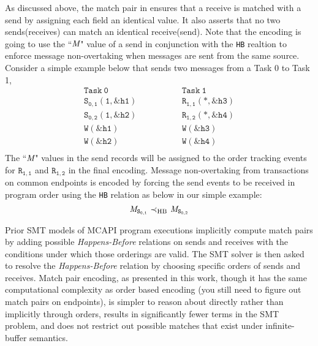 As discussed above, the match pair in  ensures that a receive is matched with a send by assigning each field an identical value. It also asserts that no two sends(receives) can match an identical receive(send). Note that the encoding is going to use the ``$\emph{M}$"  value of a send in conjunction with the \texttt{HB} realtion to enforce message non-overtaking when messages are sent from the same source. Consider a simple example below that sends two messages from a Task 0 to Task 1,
\[
\begin{array}{l|l}
\;\;\;\;\;\;\;\;\mathtt{Task\ 0}\;\;\;\;\;\;\;\; & \;\;\;\;\;\;\;\; \mathtt{Task\ 1}\;\;\;\;\;\;\;\; \\
\hline
\;\;\;\;\;\;\;\;\mathtt{S_{0,1}(1,\&h1)}\;\;\;\;\;\;\;\; & \;\;\;\;\;\;\;\; \mathtt{R_{1,1}(*,\&h3)}\;\;\;\;\;\;\;\; \\
\;\;\;\;\;\;\;\;\mathtt{S_{0,2}(1,\&h2)}\;\;\;\;\;\;\;\; & \;\;\;\;\;\;\;\; \mathtt{R_{1,2}(*,\&h4)}\;\;\;\;\;\;\;\; \\
\;\;\;\;\;\;\;\;\mathtt{W(\&h1)}\;\;\;\;\;\;\;\; & \;\;\;\;\;\;\;\; \mathtt{W(\&h3)}\;\;\;\;\;\;\;\; \\
\;\;\;\;\;\;\;\;\mathtt{W(\&h2)}\;\;\;\;\;\;\;\; & \;\;\;\;\;\;\;\; \mathtt{W(\&h4)}\;\;\;\;\;\;\;\; \\
\end{array}
\]
The ``$\emph{M}$" values in the send records will be assigned to the order tracking events for $\mathtt{R_{1,1}}$ and $\mathtt{R_{1,2}}$ in the final encoding. Message non-overtaking from transactions on common endpoints is encoded by forcing the send events to be received in program order using the \texttt{HB} relation as below in our simple example:
\[\cfgnt{M}_\mathtt{S_{0,1}}\ \mathrm{\prec_{HB}}\ \cfgnt{M}_\mathtt{S_{0,2}}\]

Prior SMT models of MCAPI program executions implicitly compute
match pairs by adding possible \emph{Happens-Before} relations on sends and
receives with the conditions under which those orderings are
valid. The SMT solver is then asked to resolve the \emph{Happens-Before}
relation by choosing specific orders of sends and receives. Match pair
encoding, as presented in this work, though it has the same
computational complexity as order based encoding (you still need to
figure out match pairs on endpoints), is simpler to reason about
directly rather than implicitly through orders, results in
significantly fewer terms in the SMT problem, and does not restrict out possible matches that exist under infinite-buffer semantics.

